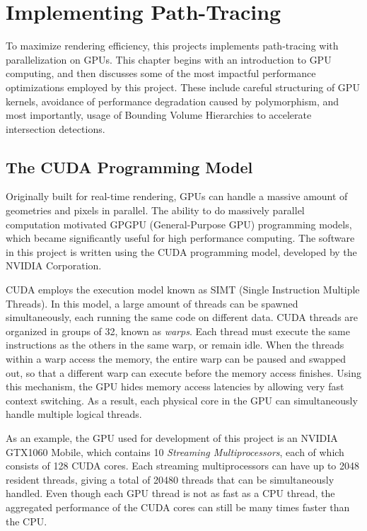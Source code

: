\chapter{Implementing Path-Tracing}
\label{chapter implementation}

To maximize rendering efficiency, this projects implements path-tracing with parallelization on GPUs. This chapter begins with an introduction to GPU computing, and then discusses some of the most impactful performance optimizations employed by this project. These include careful structuring of GPU kernels, avoidance of performance degradation caused by polymorphism, and most importantly, usage of Bounding Volume Hierarchies to accelerate intersection detections.

\section{The CUDA Programming Model}

Originally built for real-time rendering, GPUs can handle a massive amount of geometries and pixels in parallel. The ability to do massively parallel computation motivated GPGPU (General-Purpose GPU) programming models, which became significantly useful for high performance computing. The software in this project is written using the CUDA programming model, developed by the NVIDIA Corporation.

CUDA employs the execution model known as SIMT (Single Instruction Multiple Threads). In this model, a large amount of threads can be spawned simultaneously, each running the same code on different data. CUDA threads are organized in groups of 32, known as \textit{warps}. Each thread must execute the same instructions as the others in the same warp, or remain idle. When the threads within a warp access the memory, the entire warp can be paused and swapped out, so that a different warp can execute before the memory access finishes. Using this mechanism, the GPU hides memory access latencies by allowing very fast context switching. As a result, each physical core in the GPU can simultaneously handle multiple logical threads.

As an example, the GPU used for development of this project is an NVIDIA GTX1060 Mobile, which contains 10 \textit{Streaming Multiprocessors}, each of which consists of 128 CUDA cores. Each streaming multiprocessors can have up to 2048 resident threads, giving a total of 20480 threads that can be simultaneously handled. Even though each GPU thread is not as fast as a CPU thread, the aggregated performance of the CUDA cores can still be many times faster than the CPU.

